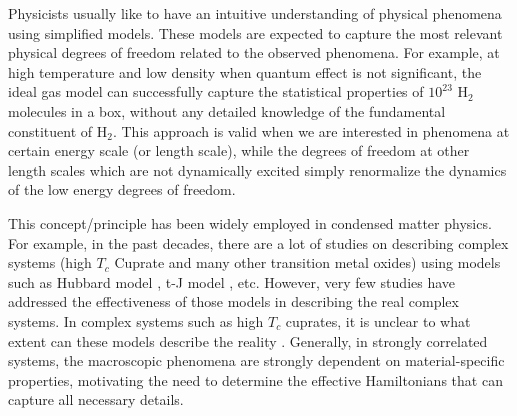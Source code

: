 \documentclass[prl,12pt,onecolumn,nofootinbib,notitlepage,english,superscriptaddress]{revtex4-1}
\newcommand{\HJC}[1]{{\color{RED}{\bf HJC: #1}}}
\begin{document}
\HJC{How are many body systems studied, coarse graining - physics/ chemistry perspectives}
Physicists usually like to have an intuitive understanding of physical phenomena using simplified models. These models are expected to capture the most relevant physical degrees of freedom related to the observed phenomena. For example, at high temperature and low density when quantum effect is not significant, the ideal gas model can successfully capture the statistical properties of $10^{23}$ H$_{2}$ molecules in a box, without any detailed knowledge of the fundamental constituent of H$_{2}$. This approach is valid when we are interested in phenomena at certain energy scale (or length scale), while the degrees of freedom at other length scales which are not dynamically excited simply renormalize the dynamics of the low energy degrees of freedom. 

\HJC{Model Hamiltonians in condensed matter}
This concept/principle has been widely employed in condensed matter physics. For example, in the past decades, there are a lot of studies on describing complex systems (high $T_c$ Cuprate and many other transition metal oxides) using models such as Hubbard model \cite{Yanagisawa2008}, t-J model \cite{Sorella2002}, etc. However, very few studies have addressed the effectiveness of those models in describing the real complex systems. In complex systems such as high $T_c$ cuprates, it is unclear to what extent can these models describe the reality \cite{Anderson2013}. Generally, in strongly correlated systems, the macroscopic phenomena are strongly dependent on material-specific properties, motivating the need to determine the effective Hamiltonians that can capture all necessary details. 
\end{document}

